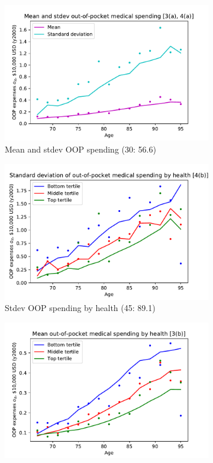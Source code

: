 \documentclass[12pt,pdftex,letterpaper]{article}
\begin{document}
\begin{figure}[h!]
    \centering
    \begin{subfigure}[b]{0.49\textwidth}
        \centering
        \includegraphics[width=\textwidth]{../Figures/OOPbyAge.pdf}
        \caption{Mean and stdev OOP spending (30: 56.6)}
    \end{subfigure}
    \begin{subfigure}[b]{0.49\textwidth}
        \centering
        \includegraphics[width=\textwidth]{../Figures/StDevOOPbyHealthAge.pdf}
        \caption{Stdev OOP spending by health (45: 89.1)}
    \end{subfigure}
\begin{subfigure}[b]{0.49\textwidth}
        \centering
        \includegraphics[width=\textwidth]{../Figures/OOPbyHealthAge.pdf}

\end{subfigure}
\end{figure}
\end{document}
